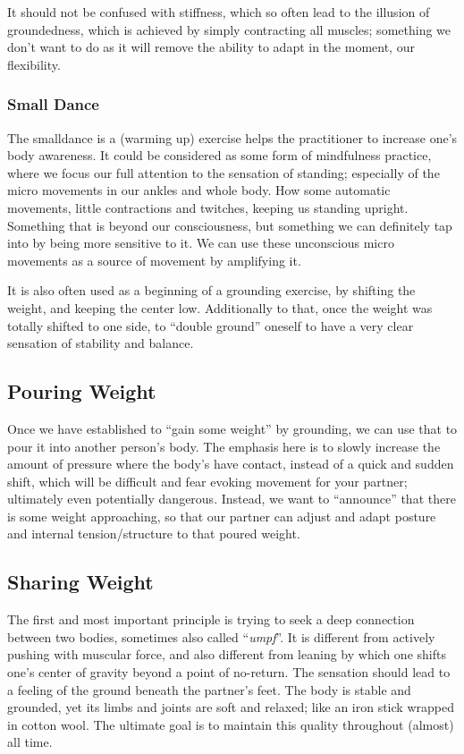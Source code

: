 It should not be confused with stiffness, which so often lead to the illusion of groundedness, which is achieved by simply contracting all muscles; something we don't want to do as it will remove the ability to adapt in the moment, our flexibility.

\subsubsection{Small Dance}

The \gls{smalldance} is a (warming up) exercise helps the practitioner to increase one's body awareness.
It could be considered as some form of mindfulness practice, where we focus our full attention to the sensation of standing; especially of the micro movements in our ankles and whole body.
How some automatic movements, little contractions and twitches, keeping us standing upright.
Something that is beyond our consciousness, but something we can definitely tap into by being more sensitive to it.
We can use these unconscious micro movements as a source of movement by amplifying it.

It is also often used as a beginning of a grounding exercise, by shifting the weight, and keeping the center low.
Additionally to that, once the weight was totally shifted to one side, to ``double ground'' oneself to have a very clear sensation of stability and balance.

\subsection{Pouring Weight}\label{subsec:pouring-weight}

Once we have established to ``gain some weight'' by grounding, we can use that to pour it into another person's body.
The emphasis here is to slowly increase the amount of pressure where the body's have contact, instead of a quick and sudden shift, which will be difficult and fear evoking movement for your partner; ultimately even potentially dangerous.
Instead, we want to ``announce'' that there is some weight approaching, so that our partner can adjust and adapt posture and internal tension/structure to that poured weight.

\subsection{Sharing Weight}\label{subsec:sharing-weight}

The first and most important principle is trying to seek a deep connection between two bodies, sometimes also called ``\textit{umpf}''.
It is different from actively pushing with muscular force, and also different from leaning by which one shifts one's center of gravity beyond a point of no-return.
The sensation should lead to a feeling of the ground beneath the partner's feet.
The body is stable and grounded, yet its limbs and joints are soft and relaxed; like an iron stick wrapped in cotton wool.
The ultimate goal is to maintain this quality throughout (almost) all time.


